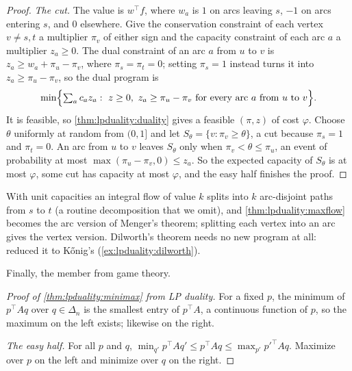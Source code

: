 \begin{refsection}
\begin{proof}
\emph{The cut.} The value is $w^\top f$, where $w_a$ is $1$ on arcs leaving $s$, $-1$ on arcs entering $s$, and $0$ elsewhere. Give the conservation constraint of each vertex $v\ne s,t$ a multiplier $\pi_v$ of either sign and the capacity constraint of each arc $a$ a multiplier $z_a\ge0$. The dual constraint of an arc $a$ from $u$ to $v$ is $z_a\ge w_a+\pi_u-\pi_v$, where $\pi_s=\pi_t=0$; setting $\pi_s=1$ instead turns it into $z_a\ge\pi_u-\pi_v$, so the dual program is
\[
\min\Bigl\{\textstyle\sum_a c_az_a:\ z\ge0,\ z_a\ge\pi_u-\pi_v\text{ for every arc }a\text{ from }u\text{ to }v\Bigr\}.
\]
It is feasible, so \cref{thm:lpduality:duality} gives a feasible $(\pi,z)$ of cost $\varphi$. Choose $\theta$ uniformly at random from $(0,1]$ and let $S_\theta=\{v:\pi_v\ge\theta\}$, a cut because $\pi_s=1$ and $\pi_t=0$. An arc from $u$ to $v$ leaves $S_\theta$ only when $\pi_v<\theta\le\pi_u$, an event of probability at most $\max(\pi_u-\pi_v,0)\le z_a$. So the expected capacity of $S_\theta$ is at most $\varphi$, some cut has capacity at most $\varphi$, and the easy half finishes the proof.
\end{proof}

With unit capacities an integral flow of value $k$ splits into $k$ arc-disjoint paths from $s$ to $t$ (a routine decomposition that we omit), and \cref{thm:lpduality:maxflow} becomes the arc version of Menger's theorem; splitting each vertex into an arc gives the vertex version. Dilworth's theorem needs no new program at all: \textcite{Fulkerson1956} reduced it to K\H{o}nig's (\cref{ex:lpduality:dilworth}).

Finally, the member from game theory.

\begin{proof}[Proof of \cref{thm:lpduality:minimax} from LP duality]
For a fixed $p$, the minimum of $p^\top Aq$ over $q\in\Delta_n$ is the smallest entry of $p^\top A$, a continuous function of $p$, so the maximum on the left exists; likewise on the right.

\emph{The easy half.} For all $p$ and $q$, $\min_{q'}p^\top Aq'\le p^\top Aq\le\max_{p'}p'^\top Aq$. Maximize over $p$ on the left and minimize over $q$ on the right.


\end{proof}
\end{refsection}

